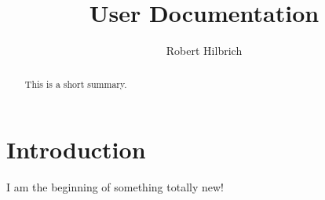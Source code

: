 \documentclass[pdftex,a4paper]{scrreprt}
\title{User Documentation}
\author{Robert Hilbrich}
\begin{document}
\maketitle

\begin{abstract}
This is a short summary.
\end{abstract}

\tableofcontents

\chapter{Introduction}

I am the beginning of something totally new!
\end{document}
